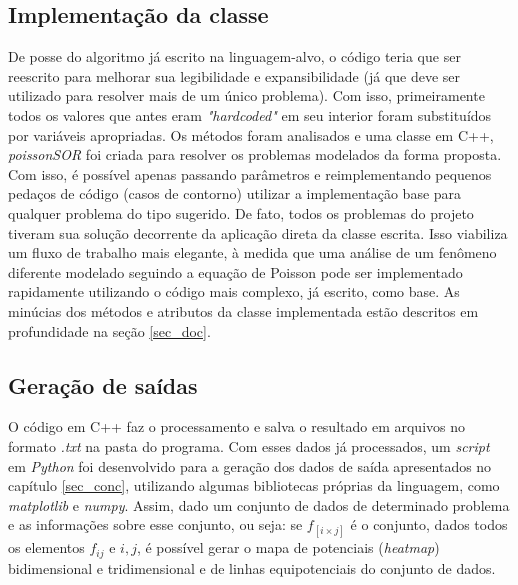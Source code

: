 \documentclass[oneside]{abntex2}
\begin{document}
\subsection{Implementação da classe}
De posse do algoritmo já escrito na linguagem-alvo, o código teria que ser reescrito para melhorar sua legibilidade e expansibilidade (já que deve ser utilizado para resolver mais de um único problema). Com isso, primeiramente todos os valores que antes eram \textit{"hardcoded"} em seu interior foram substituídos por variáveis apropriadas. Os métodos foram analisados e uma classe em C++, \textit{poissonSOR} foi criada para resolver os problemas modelados da forma proposta. Com isso, é possível apenas passando parâmetros e reimplementando pequenos pedaços de código (casos de contorno) utilizar a implementação base para qualquer problema do tipo sugerido. De fato, todos os problemas do projeto tiveram sua solução decorrente da aplicação direta da classe escrita. Isso viabiliza um fluxo de trabalho mais elegante, à medida que uma análise de um fenômeno diferente modelado seguindo a equação de Poisson pode ser implementado rapidamente utilizando o código mais complexo, já escrito, como base. As minúcias dos métodos e atributos da classe implementada estão descritos em profundidade na seção \ref{sec_doc}.

\subsection{Geração de saídas}
O código em C++ faz o processamento e salva o resultado em arquivos no formato \textit{.txt} na pasta do programa. Com esses dados já processados, um \textit{script} em \textit{Python} foi desenvolvido para a geração dos dados de saída apresentados no capítulo \ref{sec_conc}, utilizando algumas bibliotecas próprias da linguagem, como \textit{matplotlib} e \textit{numpy}. Assim, dado um conjunto de dados de determinado problema e as informações sobre esse conjunto, ou seja: se $f_{[i\times j]}$ é o conjunto, dados todos os elementos $f_{ij}$ e $i, j$, é possível gerar o mapa de potenciais (\textit{heatmap}) bidimensional e tridimensional e de linhas equipotenciais do conjunto de dados.
\end{document}
